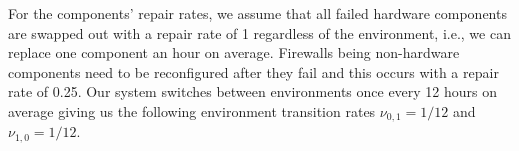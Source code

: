 \documentclass[12pt]{article}
\begin{document}
For the components' repair rates, we assume that all failed hardware
components are swapped out with a repair rate of 1 regardless of the
environment, i.e., we can replace one component an hour on average. \iffalse A
repair for a hardware component may also be having to restart that part of the
system if the component is in a dormant condition. \fi Firewalls being 
non-hardware components need to be reconfigured after they fail and this occurs
with a repair rate of 0.25. Our system switches between environments once
every 12 hours on average giving us the following environment transition rates
$\nu_{0, 1} = 1 / 12$ and $\nu_{1, 0} = 1 / 12$.



\end{document}
